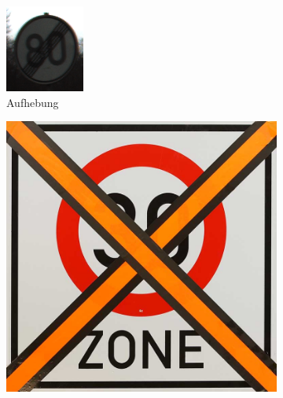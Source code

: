 \begin{figure}[H]
   \centering
   \captionsetup[subfigure]{labelformat=empty}
   \begin{subfigure}[b]{0.125\textwidth}
       \centering
       \includegraphics[height=\textwidth]{../images/Schilder Beispiele/Aufhebungsschild.png}
       \caption{Aufhebung}
       \label{fig:aufhebungsschild}
   \end{subfigure}
   \hspace{3em}%
   \begin{subfigure}[b]{0.125\textwidth}
       \centering
       \includegraphics[height=\textwidth]{../images/Schilder Beispiele/Abgeklebt.jpg}

\end{subfigure}
\end{figure}
